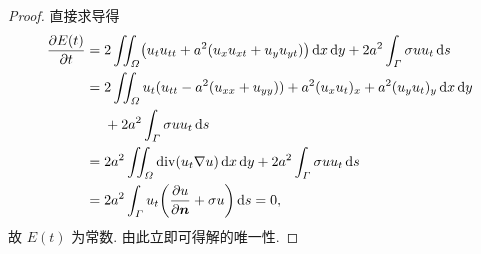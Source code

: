 \begin{proof}
  直接求导得
  \begin{align*}
    \frac{\partial E(t)}{\partial t}
    ={} & 2\iint_{\varOmega} \bigl(u_t u_{tt} + a^2(u_x u_{xt} + u_y u_{yt})\bigr)
          \diff x\diff y + 2a^2\int_{\varGamma} \sigma uu_t \diff s \\
    ={} & 2\iint_{\varOmega} u_t(u_{tt}-a^2(u_{xx}+u_{yy}))
          + a^2(u_x u_t)_x + a^2(u_y u_t)_y \diff x\diff y \\
        & + 2a^2\int_{\varGamma} \sigma uu_t \diff s \\
    ={} & 2a^2\iint_{\varOmega} \div (u_t\nabla u) \diff x\diff y
          + 2a^2\int_{\varGamma} \sigma uu_t \diff s \\
    ={} & 2a^2\int_{\varGamma} u_t \biggl(\frac{\partial u}{\partial \bm{n}}+\sigma u\biggr)
          \diff s = 0,
  \end{align*}
  故 $E(t)$ 为常数. 由此立即可得解的唯一性.
\end{proof}